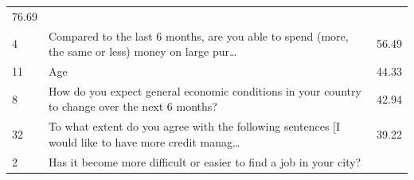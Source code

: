 \begin{longtable}[]{@{}lll@{}}
\begin{minipage}[t]{0.09\columnwidth}
76.69\strut
\end{minipage}\tabularnewline
\begin{minipage}[t]{0.05\columnwidth}\raggedright
4\strut
\end{minipage} & \begin{minipage}[t]{0.77\columnwidth}\raggedright
Compared to the last 6 months, are you able to spend (more, the same or
less) money on large pur\ldots{}\strut
\end{minipage} & \begin{minipage}[t]{0.09\columnwidth}\raggedright
56.49\strut
\end{minipage}\tabularnewline
\begin{minipage}[t]{0.05\columnwidth}\raggedright
11\strut
\end{minipage} & \begin{minipage}[t]{0.77\columnwidth}\raggedright
Age\strut
\end{minipage} & \begin{minipage}[t]{0.09\columnwidth}\raggedright
44.33\strut
\end{minipage}\tabularnewline
\begin{minipage}[t]{0.05\columnwidth}\raggedright
8\strut
\end{minipage} & \begin{minipage}[t]{0.77\columnwidth}\raggedright
How do you expect general economic conditions in your country to change
over the next 6 months?\strut
\end{minipage} & \begin{minipage}[t]{0.09\columnwidth}\raggedright
42.94\strut
\end{minipage}\tabularnewline
\begin{minipage}[t]{0.05\columnwidth}\raggedright
32\strut
\end{minipage} & \begin{minipage}[t]{0.77\columnwidth}\raggedright
To what extent do you agree with the following sentences {[}I would like
to have more credit manag\ldots{}\strut
\end{minipage} & \begin{minipage}[t]{0.09\columnwidth}\raggedright
39.22\strut
\end{minipage}\tabularnewline
\begin{minipage}[t]{0.05\columnwidth}\raggedright
2\strut
\end{minipage} & \begin{minipage}[t]{0.77\columnwidth}\raggedright
Has it become more difficult or easier to find a job in your city?\strut

\end{minipage}
\end{longtable}
